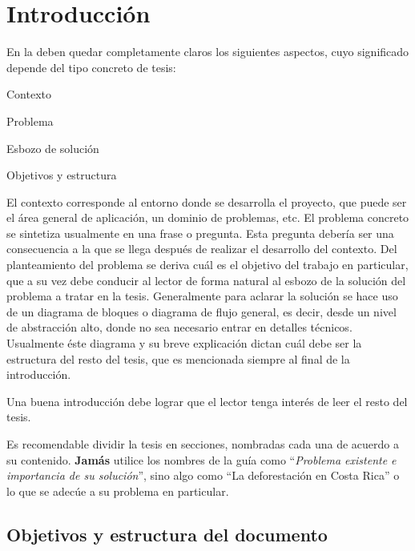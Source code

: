 
\chapter{Introducción}
\label{chp:intro}

En la  deben quedar completamente claros los siguientes
aspectos, cuyo significado depende del tipo concreto de tesis:

\begin{compactitem}
\item Contexto
\item Problema
\item Esbozo de solución
\item Objetivos y estructura
\end{compactitem}

El contexto corresponde al entorno donde se desarrolla el proyecto, que puede
ser el área general de aplicación, un dominio de problemas, etc. El problema
concreto se sintetiza usualmente en una frase o pregunta. Esta pregunta debería
ser una consecuencia a la que se llega después de realizar el desarrollo del
contexto. Del planteamiento del problema se deriva cuál es el objetivo del
trabajo en particular, que a su vez debe conducir al lector de forma natural al
esbozo de la solución del problema a tratar en la tesis. Generalmente para
aclarar la solución se hace uso de un diagrama de bloques o diagrama de flujo
general, es decir, desde un nivel de abstracción alto, donde no sea necesario
entrar en detalles técnicos. Usualmente éste diagrama y su breve explicación
dictan cuál debe ser la estructura del resto del tesis, que es mencionada
siempre al final de la introducción.

Una buena introducción debe lograr que el lector tenga interés de leer el resto
del tesis.

Es recomendable dividir la tesis en secciones, nombradas cada una de acuerdo a
su contenido. \textbf{Jamás} utilice los nombres de la guía como
``\emph{Problema existente e importancia de su solución}'', sino algo como ``La
deforestación en Costa Rica'' o lo que se adecúe a su problema en particular.

\section{Objetivos y estructura del documento}

